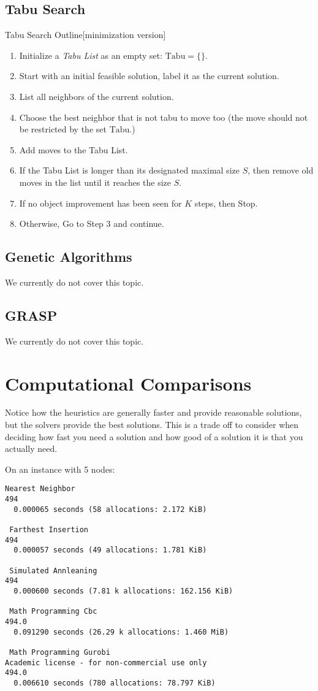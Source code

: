 \subsection{Tabu Search}
\begin{general}{Tabu Search Outline}{[minimization version]}
\begin{enumerate}
\item Initialize a \emph{Tabu List} as an empty set: $\textrm{Tabu} = \{ \}$.
\item Start with an initial feasible solution, label it as the current solution.
\item List all neighbors of the current solution.
\item Choose the best neighbor that is not tabu to move too (the move should not be restricted by the set $\textrm{Tabu}$.)
\item Add moves to the Tabu List.
\item If the Tabu List is longer than its designated maximal size $S$, then remove old moves in the list until it reaches the size $S$.
\item If no object improvement has been seen for $K$ steps, then Stop.
\item Otherwise, Go to Step 3 and continue.
\end{enumerate}
\end{general}


\subsection{Genetic Algorithms}
We currently do not cover this topic.  

\subsection{GRASP}
We currently do not cover this topic.  


\section{Computational Comparisons}
Notice how the heuristics are generally faster and provide reasonable solutions, but the solvers provide the best solutions.  This is a trade off to consider when deciding how fast you need a solution and how good of a solution it is that you actually need.  


On an instance with 5 nodes:
\begin{verbatim}
Nearest Neighbor
494
  0.000065 seconds (58 allocations: 2.172 KiB)

 Farthest Insertion
494
  0.000057 seconds (49 allocations: 1.781 KiB)

 Simulated Annleaning
494
  0.000600 seconds (7.81 k allocations: 162.156 KiB)

 Math Programming Cbc
494.0
  0.091290 seconds (26.29 k allocations: 1.460 MiB)

 Math Programming Gurobi
Academic license - for non-commercial use only
494.0
  0.006610 seconds (780 allocations: 78.797 KiB)
  \end{verbatim}
  
